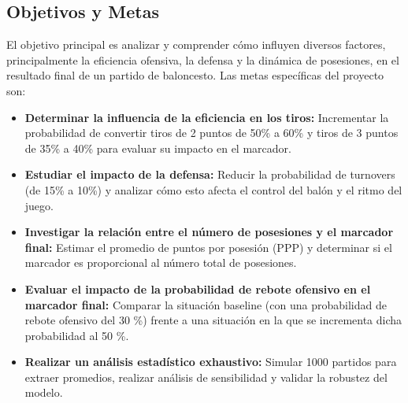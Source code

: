 \documentclass[12pt]{article}
\begin{document}
\subsection{Objetivos y Metas}
El objetivo principal es analizar y comprender cómo influyen diversos factores, principalmente la eficiencia ofensiva, la defensa y la dinámica de posesiones, en el resultado final de un partido de baloncesto. Las metas específicas del proyecto son:
\begin{itemize}
	\item \textbf{Determinar la influencia de la eficiencia en los tiros:} Incrementar la probabilidad de convertir tiros de 2 puntos de 50\% a 60\% y tiros de 3 puntos de 35\% a 40\% para evaluar su impacto en el marcador.
	\item \textbf{Estudiar el impacto de la defensa:} Reducir la probabilidad de turnovers (de 15\% a 10\%) y analizar cómo esto afecta el control del balón y el ritmo del juego.
	\item \textbf{Investigar la relación entre el número de posesiones y el marcador final:} Estimar el promedio de puntos por posesión (PPP) y determinar si el marcador es proporcional al número total de posesiones.
	\item  \textbf{Evaluar el impacto de la probabilidad de rebote ofensivo en el marcador final: } Comparar la situación baseline (con una probabilidad de rebote ofensivo del 30 \%) frente a una situación en la que se incrementa dicha probabilidad al 50 \%.
	\item \textbf{Realizar un análisis estadístico exhaustivo:} Simular 1000 partidos para extraer promedios, realizar análisis de sensibilidad y validar la robustez del modelo.
\end{itemize}
\end{document}
